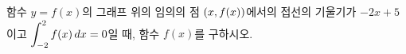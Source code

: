 함수 $y=f(x)$의 그래프 위의 임의의 점 $(x{,}\mkern3mu\mathopen{}f(x))$에서의 접선의 기울기가 $-2x+5$이고 $\displaystyle\int_{-2}^{2}f(x)\mkern3mu dx=0$일 때, 함수 $f(x)$를 구하시오.
